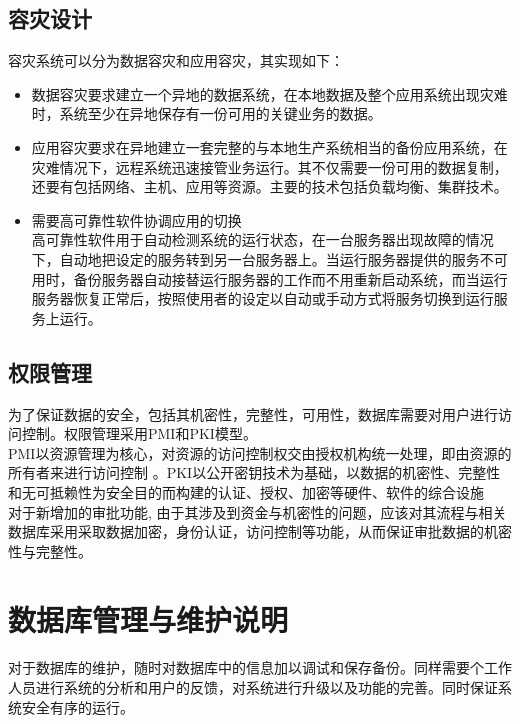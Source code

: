 \subsection{容灾设计}
容灾系统可以分为数据容灾和应用容灾，其实现如下：
\begin{itemize}
     
\item 数据容灾要求建立一个异地的数据系统，在本地数据及整个应用系统出现灾难时，系统至少在异地保存有一份可用的关键业务的数据。

\item 应用容灾要求在异地建立一套完整的与本地生产系统相当的备份应用系统，在灾难情况下，远程系统迅速接管业务运行。其不仅需要一份可用的数据复制，还要有包括网络、主机、应用等资源。主要的技术包括负载均衡、集群技术。

\item 需要高可靠性软件协调应用的切换 \\
高可靠性软件用于自动检测系统的运行状态，在一台服务器出现故障的情况下，自动地把设定的服务转到另一台服务器上。当运行服务器提供的服务不可用时，备份服务器自动接替运行服务器的工作而不用重新启动系统，而当运行服务器恢复正常后，按照使用者的设定以自动或手动方式将服务切换到运行服务上运行。
\end{itemize}

\subsection{\color{red}权限管理}
为了保证数据的安全，包括其机密性，完整性，可用性，数据库需要对用户进行访问控制。权限管理采用PMI和PKI模型。\\
PMI以资源管理为核心，对资源的访问控制权交由授权机构统一处理，即由资源的所有者来进行访问控制 。PKI以公开密钥技术为基础，以数据的机密性、完整性和无可抵赖性为安全目的而构建的认证、授权、加密等硬件、软件的综合设施 \\
{\color{red}
对于新增加的审批功能, 由于其涉及到资金与机密性的问题，应该对其流程与相关数据库采用采取数据加密，身份认证，访问控制等功能，从而保证审批数据的机密性与完整性。
}


\section{数据库管理与维护说明}
对于数据库的维护，随时对数据库中的信息加以调试和保存备份。同样需要个工作人员进行系统的分析和用户的反馈，对系统进行升级以及功能的完善。同时保证系统安全有序的运行。